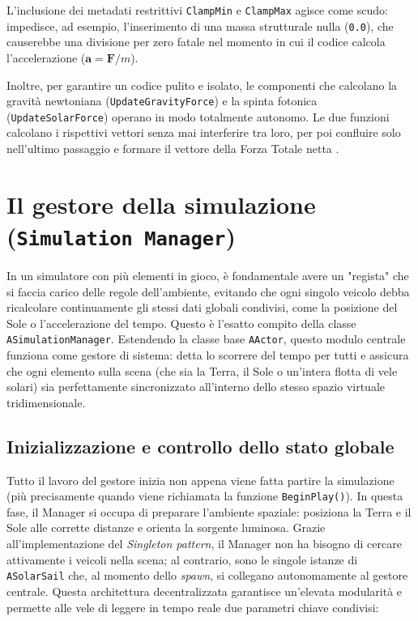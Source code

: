 L'inclusione dei metadati restrittivi \lstinline|ClampMin| e \lstinline|ClampMax| agisce come scudo: impedisce, ad esempio, l'inserimento di una massa strutturale nulla (\lstinline|0.0|), che causerebbe una divisione per zero fatale nel momento in cui il codice calcola l'accelerazione ($\mathbf{a} = \mathbf{F}/m$). 

Inoltre, per garantire un codice pulito e isolato, le componenti che calcolano la gravità newtoniana (\lstinline|UpdateGravityForce|) e la spinta fotonica (\lstinline|UpdateSolarForce|) operano in modo totalmente autonomo. Le due funzioni calcolano i rispettivi vettori senza mai interferire tra loro, per poi confluire solo nell'ultimo passaggio e formare il vettore della Forza Totale netta \cite{curtis2005orbital, mcinnes1999solar}.


\section{Il gestore della simulazione (\texttt{Simulation Manager})}

In un simulatore con più elementi in gioco, è fondamentale avere un "regista" che si faccia carico delle regole dell'ambiente, evitando che ogni singolo veicolo debba ricalcolare continuamente gli stessi dati globali condivisi, come la posizione del Sole o l'accelerazione del tempo. Questo è l'esatto compito della classe \lstinline|ASimulationManager|. Estendendo la classe base \lstinline|AActor|, questo modulo centrale funziona come gestore di sistema: detta lo scorrere del tempo per tutti e assicura che ogni elemento sulla scena (che sia la Terra, il Sole o un'intera flotta di vele solari) sia perfettamente sincronizzato all'interno dello stesso spazio virtuale tridimensionale.


\subsection{Inizializzazione e controllo dello stato globale}

Tutto il lavoro del gestore inizia non appena viene fatta partire la simulazione (più precisamente quando viene richiamata la funzione \lstinline|BeginPlay()|). In questa fase, il Manager si occupa di preparare l'ambiente spaziale: posiziona la Terra e il Sole alle corrette distanze e orienta la sorgente luminosa. Grazie all'implementazione del \textit{Singleton pattern}, il Manager non ha bisogno di cercare attivamente i veicoli nella scena; al contrario, sono le singole istanze di \lstinline|ASolarSail| che, al momento dello \textit{spawn}, si collegano autonomamente al gestore centrale.
Questa architettura decentralizzata garantisce un'elevata modularità e permette alle vele di leggere in tempo reale due parametri chiave condivisi:

